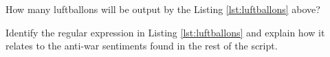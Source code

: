 \documentclass[11pt]{article}
\begin{document}

\begin{question}




\begin{subquestion}{How many luftballons will be output by the Listing \ref{lst:luftballons} above?} %


\end{subquestion}


\begin{subquestion}{Identify the regular expression in Listing \ref{lst:luftballons} and explain how it relates to the anti-war sentiments found in the rest of the script.} %


\end{subquestion}


\end{question}

\end{document}
